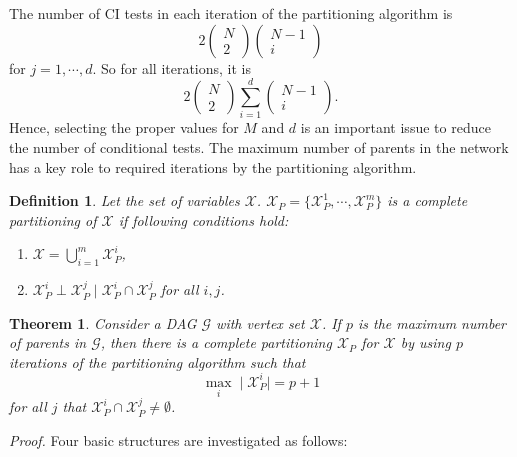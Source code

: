 \documentclass{article}
\newtheorem{theorem}{Theorem}
\newtheorem{definition}{Definition}
\newcommand{\X}{\mathcal{X}}
\newcommand{\G}{\mathcal{G}}
\begin{document}
The number of CI tests in each iteration of the partitioning algorithm is 
$$
   2\left( {\begin{array}{*{20}{c}}
    N\\
    2
    \end{array}} \right)\left( {\begin{array}{*{20}{c}}
    {N - 1}\\
    i
    \end{array}} \right)
$$
for $j = 1,\cdots, d$. So for all iterations, it is 
$$
   2\left( {\begin{array}{*{20}{c}}
    N\\
    2
    \end{array}} \right)\sum\limits_{i = 1}^{ d} {\left( {\begin{array}{*{20}{c}}
    {N - 1}\\
    i
    \end{array}} \right)} 
    .
$$
Hence, selecting the proper values for $M$ and $d$ is an important issue to reduce the number of conditional tests.
The maximum number of parents in the network has a key role to required iterations by the partitioning algorithm.
\begin{definition}\label{complete-partitioning}
    Let the set of variables $\X$. $\X_P = \{\X_P^1,\cdots, \X_P^m \}$ is a complete partitioning of $\X$ if following conditions hold:
    \begin{enumerate}
        \item $\X = \bigcup\limits_{i=1}^{m} \X_P^i$,
        \item $\X_P^i\perp \X_P^j \mid \X_P^i\cap \X_P^j$ for all $i,j$.
    \end{enumerate}
\end{definition}
\begin{theorem}
    Consider a DAG $\G$ with vertex set $\X$. If $p$ is the maximum number of parents in $\G$, then there is a complete partitioning $\X_P$ for $\X$ by using $p$ iterations of the partitioning algorithm such that 
    $$ \max\limits_{i} \mid \X_P^i \mid = p+1$$
    for all $j$ that $\X_P^i \cap \X_P^j\not = \emptyset$. 
\end{theorem}
\emph{Proof.}
    Four basic structures are investigated as follows:
\end{document}
